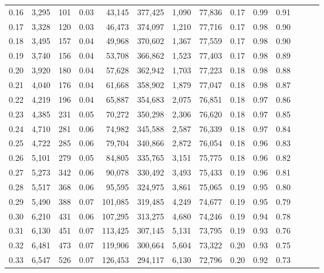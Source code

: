 \begin{tabular}{rrrrrrrrrrrrrr}
0.16 &   3,295 &    101 &  0.03 &   43,145 &  377,425 &   1,090 &  77,836 &  0.17 &  0.99 &      0.91 \\
0.17 &   3,328 &    120 &  0.03 &   46,473 &  374,097 &   1,210 &  77,716 &  0.17 &  0.98 &      0.90 \\
0.18 &   3,495 &    157 &  0.04 &   49,968 &  370,602 &   1,367 &  77,559 &  0.17 &  0.98 &      0.90 \\
0.19 &   3,740 &    156 &  0.04 &   53,708 &  366,862 &   1,523 &  77,403 &  0.17 &  0.98 &      0.89 \\
0.20 &   3,920 &    180 &  0.04 &   57,628 &  362,942 &   1,703 &  77,223 &  0.18 &  0.98 &      0.88 \\
0.21 &   4,040 &    176 &  0.04 &   61,668 &  358,902 &   1,879 &  77,047 &  0.18 &  0.98 &      0.87 \\
0.22 &   4,219 &    196 &  0.04 &   65,887 &  354,683 &   2,075 &  76,851 &  0.18 &  0.97 &      0.86 \\
0.23 &   4,385 &    231 &  0.05 &   70,272 &  350,298 &   2,306 &  76,620 &  0.18 &  0.97 &      0.85 \\
0.24 &   4,710 &    281 &  0.06 &   74,982 &  345,588 &   2,587 &  76,339 &  0.18 &  0.97 &      0.84 \\
0.25 &   4,722 &    285 &  0.06 &   79,704 &  340,866 &   2,872 &  76,054 &  0.18 &  0.96 &      0.83 \\
0.26 &   5,101 &    279 &  0.05 &   84,805 &  335,765 &   3,151 &  75,775 &  0.18 &  0.96 &      0.82 \\
0.27 &   5,273 &    342 &  0.06 &   90,078 &  330,492 &   3,493 &  75,433 &  0.19 &  0.96 &      0.81 \\
0.28 &   5,517 &    368 &  0.06 &   95,595 &  324,975 &   3,861 &  75,065 &  0.19 &  0.95 &      0.80 \\
0.29 &   5,490 &    388 &  0.07 &  101,085 &  319,485 &   4,249 &  74,677 &  0.19 &  0.95 &      0.79 \\
0.30 &   6,210 &    431 &  0.06 &  107,295 &  313,275 &   4,680 &  74,246 &  0.19 &  0.94 &      0.78 \\
0.31 &   6,130 &    451 &  0.07 &  113,425 &  307,145 &   5,131 &  73,795 &  0.19 &  0.93 &      0.76 \\
0.32 &   6,481 &    473 &  0.07 &  119,906 &  300,664 &   5,604 &  73,322 &  0.20 &  0.93 &      0.75 \\
0.33 &   6,547 &    526 &  0.07 &  126,453 &  294,117 &   6,130 &  72,796 &  0.20 &  0.92 &      0.73 \\

\end{tabular}
